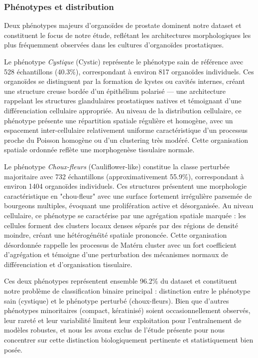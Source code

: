 \subsubsection{Phénotypes et distribution}

Deux phénotypes majeurs d'organoïdes de prostate dominent notre dataset et constituent le focus de notre étude, reflétant les architectures morphologiques les plus fréquemment observées dans les cultures d'organoïdes prostatiques.

Le phénotype \textit{Cystique} (Cystic) représente le phénotype sain de référence avec 528 échantillons (40.3\%), correspondant à environ 817 organoïdes individuels. Ces organoïdes se distinguent par la formation de kystes ou cavités internes, créant une structure creuse bordée d'un épithélium polarisé — une architecture rappelant les structures glandulaires prostatiques natives et témoignant d'une différenciation cellulaire appropriée. Au niveau de la distribution cellulaire, ce phénotype présente une répartition spatiale régulière et homogène, avec un espacement inter-cellulaire relativement uniforme caractéristique d'un processus proche du Poisson homogène ou d'un clustering très modéré. Cette organisation spatiale ordonnée reflète une morphogenèse tissulaire normale.

Le phénotype \textit{Choux-fleurs} (Cauliflower-like) constitue la classe perturbée majoritaire avec 732 échantillons (approximativement 55.9\%), correspondant à environ 1404 organoïdes individuels. Ces structures présentent une morphologie caractéristique en "chou-fleur" avec une surface fortement irrégulière parsemée de bourgeons multiples, évoquant une prolifération active et désorganisée. Au niveau cellulaire, ce phénotype se caractérise par une agrégation spatiale marquée : les cellules forment des clusters locaux denses séparés par des régions de densité moindre, créant une hétérogénéité spatiale prononcée. Cette organisation désordonnée rappelle les processus de Matérn cluster avec un fort coefficient d'agrégation et témoigne d'une perturbation des mécanismes normaux de différenciation et d'organisation tissulaire.

Ces deux phénotypes représentent ensemble 96.2\% du dataset et constituent notre problème de classification binaire principal : distinction entre le phénotype sain (cystique) et le phénotype perturbé (choux-fleurs). Bien que d'autres phénotypes minoritaires (compact, kératinisé) soient occasionnellement observés, leur rareté et leur variabilité limitent leur exploitation pour l'entraînement de modèles robustes, et nous les avons exclus de l'étude présente pour nous concentrer sur cette distinction biologiquement pertinente et statistiquement bien posée.


